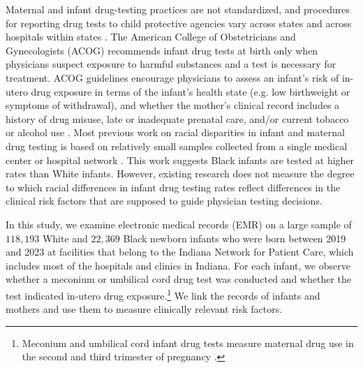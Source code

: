 Maternal and infant drug-testing practices are not standardized, and procedures for reporting drug tests to child protective agencies vary across states and across hospitals within states \citep{national2018understanding, mascola2017opioid}. The American College of Obstetricians and Gynecologists (ACOG) recommends infant drug tests at birth only when physicians suspect exposure to harmful substances and a test is necessary for treatment. ACOG guidelines encourage physicians to assess an infant's risk of in-utero drug exposure in terms of the infant's health state (e.g. low birthweight or symptoms of withdrawal), and whether the mother's clinical record includes a history of drug misuse, late or inadequate prenatal care, and/or current tobacco or alcohol use \citep{palmer2017evaluating}. Most previous work on racial disparities in infant and maternal drug testing is based on relatively small samples collected from a single medical center or hospital network \citep{simpson2022prediction,Soos2024,schoneich2023incidence,kunins2007effect}. This work suggests Black infants are tested at higher rates than White infants. However, existing research does not measure the degree to which racial differences in infant drug testing rates reflect differences in the clinical risk factors that are supposed to guide physician testing decisions.  

In this study, we examine electronic medical records (EMR) on a large sample of $118,193$ White and $22,369$ Black newborn infants who were born between 2019 and 2023 at facilities that belong to the Indiana Network for Patient Care, which includes most of the hospitals and clinics in Indiana. For each infant, we observe whether a meconium or umbilical cord drug test was conducted and whether the test indicated in-utero drug exposure.\footnote{Meconium and umbilical cord infant drug tests measure maternal drug use in the second and third trimester of pregnancy \citep{nms_labs_newborn_2021}.} We link the records of infants and mothers and use them to measure clinically relevant risk factors.  

